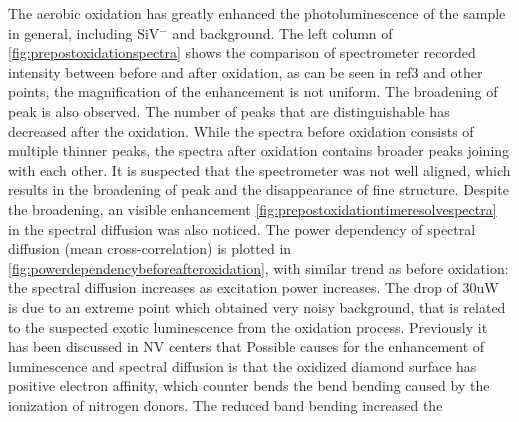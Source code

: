 The aerobic oxidation has greatly enhanced the photoluminescence of the sample in general, including SiV$^{-}$ and background. The left column of \ref{fig:prepostoxidationspectra} shows the comparison of spectrometer recorded intensity between before and after oxidation, as can be seen in ref3 and other points, the magnification of the enhancement is not uniform. The broadening of peak is also observed. The number of peaks that are distinguishable has decreased after the oxidation. While the spectra before oxidation consists of multiple thinner peaks, the spectra after oxidation contains broader peaks joining with each other. It is suspected that the spectrometer was not well aligned, which results in the broadening of peak  and the disappearance of fine structure. Despite the broadening, an visible enhancement \ref{fig:prepostoxidationtimeresolvespectra} in the spectral diffusion was also noticed. The power dependency of spectral diffusion (mean cross-correlation) is plotted in \ref{fig:powerdependencybeforeafteroxidation}, with similar trend as before oxidation: the spectral diffusion increases as excitation power increases. The drop of 30uW is due to an extreme point which obtained very noisy background, that is related to the suspected exotic luminescence from the oxidation process. 
Previously it has been discussed in NV centers that 
Possible causes for the enhancement of luminescence and spectral diffusion is that the oxidized diamond surface has positive electron affinity, which counter bends the bend bending caused by the ionization of nitrogen donors. The reduced band bending increased the 
